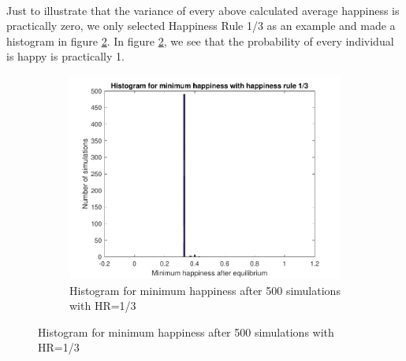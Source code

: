 \\
Just to illustrate that the variance of every above calculated average happiness is practically zero, we only selected Happiness Rule 1/3 as an example and made a histogram in figure \ref{minhappy}. 
In figure \ref{minhappy}, we see that the probability of every individual is happy is practically 1.
\newpage
\begin{figure}[H]
    \centering
    \begin{subfigure}{0.8\textwidth}
        \includegraphics[width=\textwidth]{histogram_min_happiness_een_derde}
    \caption{Histogram for minimum happiness after 500 simulations with HR=1/3 }
    \label{minhappy}
    \end{subfigure}
\end{figure}
